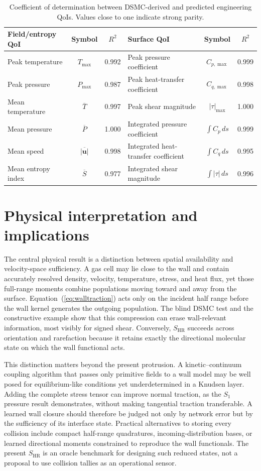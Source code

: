 \documentclass[aip,pof,preprint,floatfix,amsmath,amssymb]{revtex4-2}
\begin{document}
\begin{table}[t]
\centering
\caption{Coefficient of determination between DSMC-derived and predicted engineering QoIs. Values close to one indicate strong parity.}
\label{tab:qoi}
\begin{tabular}{lcc@{\qquad}lcc}
\toprule
Field/entropy QoI & Symbol & $R^2$ & Surface QoI & Symbol & $R^2$ \\
\midrule
Peak temperature & $T_{\max}$ & 0.992 & Peak pressure coefficient & $C_{p,\max}$ & 0.999 \\
Peak pressure & $P_{\max}$ & 0.987 & Peak heat-transfer coefficient & $C_{q,\max}$ & 0.998 \\
Mean temperature & $\overline{T}$ & 0.997 & Peak shear magnitude & $|\tau|_{\max}$ & 1.000 \\
Mean pressure & $\overline{P}$ & 1.000 & Integrated pressure coefficient & $\int C_p\,ds$ & 0.999 \\
Mean speed & $\overline{|\mathbf{u}|}$ & 0.998 & Integrated heat-transfer coefficient & $\int C_q\,ds$ & 0.995 \\
Mean entropy index & $\overline{S}$ & 0.977 & Integrated shear magnitude & $\int |\tau|\,ds$ & 0.996 \\

\bottomrule
\end{tabular}
\end{table}

\section{Physical interpretation and implications}
The central physical result is a distinction between spatial availability and velocity-space sufficiency. A gas cell may lie close to the wall and contain accurately resolved density, velocity, temperature, stress, and heat flux, yet those full-range moments combine populations moving toward and away from the surface. Equation~(\ref{eq:walltraction}) acts only on the incident half range before the wall kernel generates the outgoing population. The blind DSMC test and the constructive example show that this compression can erase wall-relevant information, most visibly for signed shear. Conversely, $S_{\mathrm{HR}}$ succeeds across orientation and rarefaction because it retains exactly the directional molecular state on which the wall functional acts.

This distinction matters beyond the present protrusion. A kinetic--continuum coupling algorithm that passes only primitive fields to a wall model may be well posed for equilibrium-like conditions yet underdetermined in a Knudsen layer. Adding the complete stress tensor can improve normal traction, as the $S_1$ pressure result demonstrates, without making tangential traction transferable. A learned wall closure should therefore be judged not only by network error but by the sufficiency of its interface state. Practical alternatives to storing every collision include compact half-range quadratures, incoming-distribution bases, or learned directional moments constrained to reproduce the wall functionals. The present $S_{\mathrm{HR}}$ is an oracle benchmark for designing such reduced states, not a proposal to use collision tallies as an operational sensor.
\end{document}
